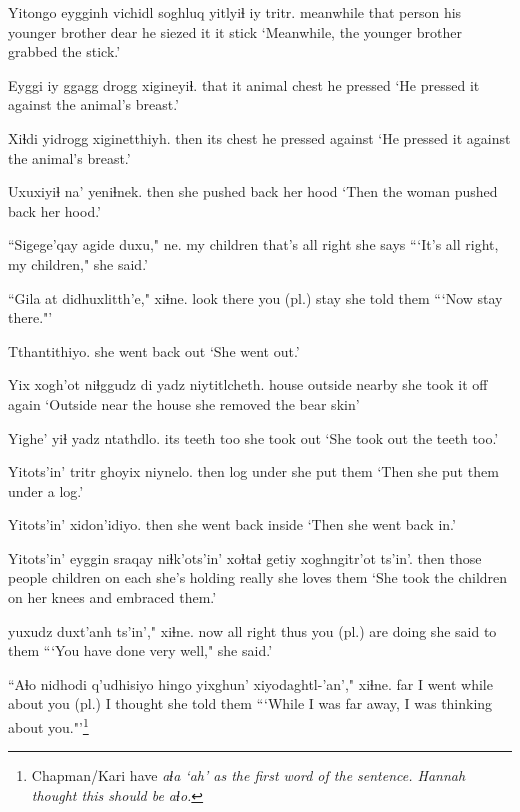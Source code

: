 \documentclass[12pt]{article}
\begin{document}
\gll Yitongo eygginh vichidl  soghluq yitlyiɬ  iy tritr.
meanwhile {that person} {his younger brother} dear  {he siezed it} it stick
\glt `Meanwhile, the younger brother grabbed the stick.'
\glend 

\gll Eyggi iy ggagg  drogg  xigineyiɬ.
that  it animal chest  {he pressed}
\glt  `He pressed it against the animal's breast.'
\glend 

\gll Xiɬdi yidrogg xiginetthiyh.
then {its chest} {he pressed against}
\glt `He pressed it against the animal's breast.'
\glend 

\gll Uxuxiyiɬ {na' yeniɬnek.}
then   {she pushed back her hood}
\glt `Then the woman pushed back her hood.'
\glend 

\gll ``Sigege'qay  {agide duxu,"} ne.
{my children}  {that's all right} {she says}
\glt ```It's all right, my children," she said.'
\glend 

\gll ``Gila at didhuxlitth'e," xiɬne.
look there {you (pl.) stay}  {she told them}
\glt ```Now stay there."'
\glend 

\gll Tthantithiyo.
{{she went back out}}
\glt `She went out.'
\glend 

\gll Yix xogh'ot {niɬggudz di} {yadz niytitlcheth.}
house outside  nearby   {she took it off again}
\glt `Outside near the house she removed the bear skin'
\glend 

\gll Yighe' yiɬ {yadz ntathdlo.}
{its teeth}  too {she took out}
\glt `She took out the teeth too.'
\glend 

\gll Yitots'in' tritr ghoyix niynelo.
then  log under  {she put them}
\glt `Then she put them under a log.'
\glend 

\gll Yitots'in' xidon'idiyo.
then  {she went back inside}
\glt `Then she went back in.'
\glend 

\gll Yitots'in' eyggin sraqay  niɬk'ots'in' xoɬtaɬ  getiy xoghngitr'ot ts'in'.
then  {those people}  children {on each} {she's holding} really {she loves them} {}
\glt `She took the children on her knees and embraced them.'
\glend 

 yuxudz duxt'anh ts'in'," xiɬne.
{now all right}  thus  {you (pl.) are doing} {} {she said to them}
\glt ```You have done very well," she said.'
\glend 

\gll ``Aɬo nidhodi q'udhisiyo hingo yixghun' xiyodaghtl-'an'," xiɬne.
{} far {I went}  while {about you (pl.)} {I thought} {she told them}
\glt ```While I was far away, I was thinking about you."'\footnote{Chapman/Kari have \em aɬa `ah' as the first word of the sentence. Hannah thought this should be \em aɬo.}
\glend 
\end{document}
